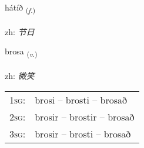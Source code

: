 \documentclass[frontgrid, backgrid]{flacards}\usepackage[]{graphicx}\usepackage[]{color}
\begin{document}
\renewcommand{\flhead}{\vskip5pt \fboxsep=0pt {\small\bfseries\footnotesize Nafnorð | 名词}}
\renewcommand{\fcfoot}{\vskip5pt \fboxsep=0pt \hspace{2pt}{\small\bfseries\footnotesize 2K}}

\renewcommand{\blhead}{\vskip5pt {\small\bfseries\footnotesize Nafnorð | 名词 }}
\renewcommand{\bcfoot}{\vskip5pt \hspace{2pt}{\small\bfseries\footnotesize 2K}}


{hátíð \small{\textsubscript{(\textit{f.})}} \\[1ex] %
\textphonetic{[hauːtʰið]} \\
zh: \emph{节日} \\  [2ex]
\renewcommand*{\arraystretch}{0.8}
}

\renewcommand{\flhead}{\vskip5pt \fboxsep=0pt {\small\bfseries\footnotesize Sagnorð | 动词}}
\renewcommand{\fcfoot}{\vskip5pt \fboxsep=0pt \hspace{2pt}{\small\bfseries\footnotesize 2K}}

\renewcommand{\blhead}{\vskip5pt {\small\bfseries\footnotesize Sagnorð | 动词 }}
\renewcommand{\bcfoot}{\vskip5pt \hspace{2pt}{\small\bfseries\footnotesize 2K}}


{brosa \small{\textsubscript{(\textit{v.})}} \\[1ex] %
\textphonetic{[prɔːsa]} \\
zh: \emph{微笑} \\  [2ex]
\renewcommand*{\arraystretch}{0.8}
\begin{tabular}{p{1cm}l}
\textsc{1sg}: & brosi -- brosti -- brosað \\ 
\textsc{2sg}: & brosir -- brostir -- brosað \\ 
\textsc{3sg}: & brosir -- brosti -- brosað \\ 
\end{tabular}
}
\end{document}
